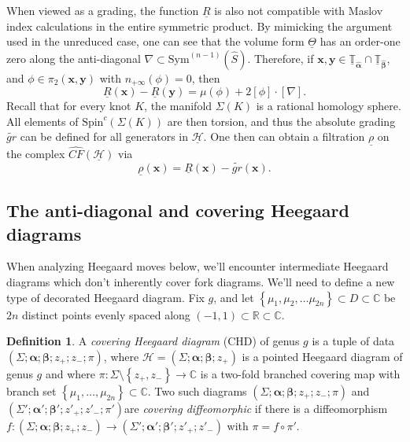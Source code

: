 \documentclass[11pt]{article}
\theoremstyle{plain} \newtheorem{thm}{Theorem}[subsection]
\theoremstyle{plain} \newtheorem{cor}[thm]{Corollary}
\theoremstyle{plain} \newtheorem{prop}[thm]{Proposition}
\theoremstyle{plain} \newtheorem{conj}[thm]{Conjecture}
\theoremstyle{plain} \newtheorem{lem}[thm]{Lemma}
\theoremstyle{definition} \newtheorem{df}[thm]{Definition}
\theoremstyle{remark} \newtheorem{rmk}[thm]{Remark}
\theoremstyle{remark} \newtheorem{obs}[thm]{Observation}
\newcommand{\DBC}[1]{\Sigma(#1)}
\newcommand{\h}{\mathcal{H}}
\newcommand{\tld}[1]{\widetilde{#1}}
\newcommand{\red}[1]{\underline{#1}}
\newcommand{\ba}{\boldsymbol{\alpha}}
\newcommand{\bb}{\boldsymbol{\beta}}
\newcommand{\bah}{\widehat{\ba}}
\newcommand{\bbh}{\widehat{\bb}}
\newcommand{\Tahr}{\red{\mathbb{T}}_{\bah}}
\newcommand{\Tbhr}{\red{\mathbb{T}}_{\bbh}}
\newcommand{\bx}{\mathbf{x}}
\newcommand{\by}{\mathbf{y}}
\newcommand{\AD}{\nabla}
\numberwithin{equation}{section}
\begin{document}
When viewed as a grading, the function $\red{R}$ is also not compatible with Maslov index calculations in the  entire symmetric product.  By mimicking the argument used in the unreduced case, one can see that the volume form $\red{\Theta}$ has an order-one zero along the anti-diagonal $\AD \subset \text{Sym}^{(n-1)}(\widehat{S})$.  Therefore, if $\bx, \by \in \Tahr \cap \Tbhr$, and $\phi \in \pi_{2}(\bx, \by)$ with $n_{+\infty}(\phi)=0$, then
\begin{equation*}\label{eqn:diff}
\red{R}(\bx) - \red{R}(\by) = \mu(\phi)+ 2[\phi]\cdot[\AD].
\end{equation*}
Recall that for every knot $K$, the manifold $\DBC{K}$ is a rational homology sphere.  All elements of $\text{Spin}^{c}(\DBC{K})$ are then torsion, and thus the absolute grading $\tld{gr}$ can be defined for all generators in $\red{\h}$.  One then can obtain a filtration $\red{\rho}$ on the complex $\widehat{CF}(\red{\h})$ via
\begin{equation*}
\red{\rho}(\bx) = \red{R}(\bx) - \tld{gr}(\bx).
\end{equation*}

\subsection{The anti-diagonal and covering Heegaard diagrams}

When analyzing Heegaard moves below, we'll encounter intermediate Heegaard diagrams which don't inherently cover fork diagrams.  We'll need to define a new type of decorated Heegaard diagram.  Fix $g$, and let $\left\{ \mu_1, \mu_2, \ldots \mu_{2n} \right\} \subset D \subset \mathbb{C}$ be $2n$ distinct points evenly spaced along $(-1,1) \subset \mathbb{R} \subset \mathbb{C}$. 

\begin{df}\label{def:chd}
A \emph{covering Heegaard diagram} (CHD) of genus $g$ is a tuple of data $\left( \Sigma; \ba; \bb; z_+; z_-; \pi\right)$, where $\mathcal{H} = \left( \Sigma; \ba; \bb; z_+ \right)$ is a pointed Heegaard diagram of genus $g$ and where $\pi: \Sigma \setminus \left\{ z_+, z_- \right\} \rightarrow \mathbb{C}$ is a two-fold branched covering map with branch set $\left\{ \mu_1, \ldots, \mu_{2n} \right\} \subset \mathbb{C}$.  Two such diagrams $\left( \Sigma; \ba; \bb; z_+; z_-; \pi\right)$ and $\left( \Sigma'; \ba'; \bb'; z'_+; z'_-; \pi'\right)$are \emph{covering diffeomorphic} if there is a diffeomorphism $f:\left(  \Sigma; \ba; \bb; z_+; z_-\right) \rightarrow \left(  \Sigma'; \ba'; \bb'; z'_+; z'_-\right)$ with $\pi = f \circ \pi'$.
\end{df}
\end{document}
